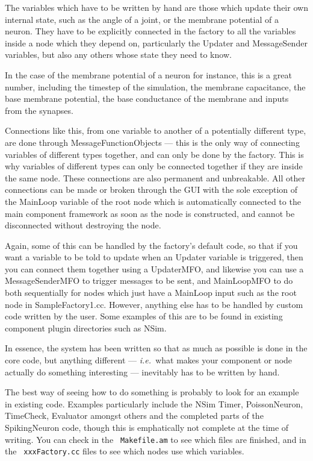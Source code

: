 \documentclass[pdftex,a4paper]{article}
\newcommand{\ie}{{\em i.e.\ }}
\begin{document}
The variables which have to be written by hand are those which update
their own internal state, such as the angle of a joint, or the
membrane potential of a neuron. They have to be explicitly connected
in the factory to all the variables inside a node which they depend
on, particularly the Updater and MessageSender variables, but also any
others whose state they need to know.

In the case of the membrane potential of a neuron for instance, this
is a great number, including the timestep of the simulation, the
membrane capacitance, the base membrane potential, the base
conductance of the membrane and inputs from the synapses.

Connections like this, from one variable to another of a potentially
different type, are done through MessageFunctionObjects --- this is
the only way of connecting variables of different types together, and
can only be done by the factory. This is why variables of different
types can only be connected together if they are inside the same
node. These connections are also permanent and unbreakable. All other
connections can be made or broken through the GUI with the sole
exception of the MainLoop variable of the root node which is
automatically connected to the main component framework as soon as the
node is constructed, and cannot be disconnected without destroying the
node.

Again, some of this can be handled by the factory's default code, so
that if you want a variable to be told to update when an Updater
variable is triggered, then you can connect them together using a
UpdaterMFO, and likewise you can use a MessageSenderMFO to trigger
messages to be sent, and MainLoopMFO to do both sequentially for nodes
which just have a MainLoop input such as the root node in
SampleFactory1.cc. However, anything else has to be handled by custom
code written by the user. Some examples of this are to be found in
existing component plugin directories such as NSim.

In essence, the system has been written so that as much as possible
is done in the core code, but anything different --- \ie what makes
your component or node actually do something interesting ---
inevitably has to be written by hand.

The best way of seeing how to do something is probably to look for an
example in existing code. Examples particularly include the NSim
Timer, PoissonNeuron, TimeCheck, Evaluator amongst others and the
completed parts of the SpikingNeuron code, though this is emphatically
not complete at the time of writing. You can check in the {\tt
Makefile.am} to see which files are finished, and in the {\tt
xxxFactory.cc} files to see which nodes use which variables.
\end{document}
